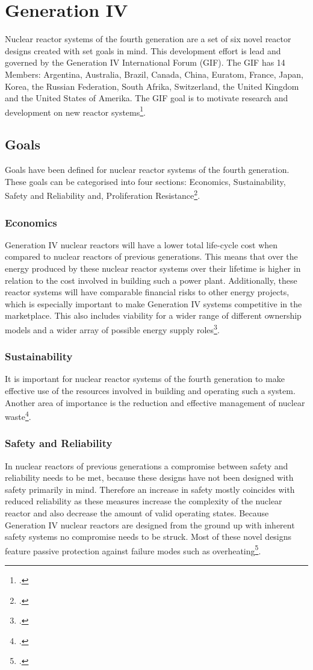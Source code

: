 \chapter{Generation IV}
Nuclear reactor systems of the fourth generation are a set of six novel reactor designs created with
set goals in mind. This development effort is lead and governed by the Generation IV International Forum
(GIF). The GIF has 14 Members: Argentina, Australia, Brazil, Canada, China, Euratom, France, Japan,
Korea, the Russian Federation, South Afrika, Switzerland, the United Kingdom and the United States of Amerika.
The GIF goal is to motivate research and development on new reactor systems\footcite[6]{GIFAR}.
\section{Goals}
Goals have been defined for nuclear reactor systems of the fourth generation. These goals
can be categorised into four sections: Economics, Sustainability, Safety and Reliability and, Proliferation Resistance\footcite[38]{IVHandbook}.
\subsection{Economics}
Generation IV nuclear reactors will have a lower total life-cycle cost when compared to nuclear reactors
of previous generations. This means that over the energy produced by these nuclear reactor systems over
their lifetime is higher in relation to the cost involved in building such a power plant.
Additionally, these reactor systems will have comparable financial risks to other energy projects, which
is especially important to make Generation IV systems competitive in the marketplace. This also includes
viability for a wider range of different ownership models and a wider array of possible energy supply roles\footcite[6]{GIFAR}.
\subsection{Sustainability}
It is important for nuclear reactor systems of the fourth generation to make effective use of the resources
involved in building and operating such a system. Another area of importance is the reduction and effective
management of nuclear waste\footcite[38]{IVHandbook}.
\subsection{Safety and Reliability}
In nuclear reactors of previous generations a compromise between safety and reliability needs to be met,
because these designs have not been designed with safety primarily in mind. Therefore an increase in safety
mostly coincides with reduced reliability as these measures increase the complexity of the nuclear reactor and
also decrease the amount of valid operating states. Because Generation IV nuclear reactors are designed from the ground up
with inherent safety systems no compromise needs to be struck. Most of these novel designs feature passive
protection against failure modes such as overheating\footcite[6]{GIFAR}.
